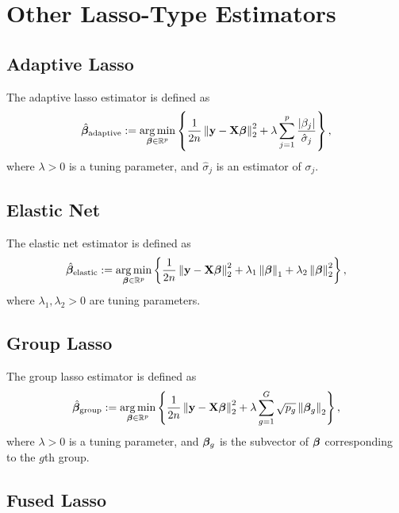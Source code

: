\section{Other Lasso-Type Estimators}

\subsection{Adaptive Lasso}

The adaptive lasso estimator is defined as
\begin{equation*}
	\hat{\boldsymbol{\beta}}_{\text{adaptive}}:=\underset{\boldsymbol{\beta}\in{\mathbb R}^{p}}{\arg\min}\left\{\frac{1}{2n}\left\|{\bf y}-{\bf X}\boldsymbol{\beta}\right\|_{2}^{2}+\lambda\sum_{j=1}^{p}\frac{\left|\beta_{j}\right|}{\hat{\sigma}_{j}}\right\},
\end{equation*}
where $\lambda>0$ is a tuning parameter, and $\hat{\sigma}_{j}$ is an estimator of $\sigma_{j}$.

\subsection{Elastic Net}

The elastic net estimator is defined as
\begin{equation*}
	\hat{\boldsymbol{\beta}}_{\text{elastic}}:=\underset{\boldsymbol{\beta}\in{\mathbb R}^{p}}{\arg\min}\left\{\frac{1}{2n}\left\|{\bf y}-{\bf X}\boldsymbol{\beta}\right\|_{2}^{2}+\lambda_{1}\left\|\boldsymbol{\beta}\right\|_{1}+\lambda_{2}\left\|\boldsymbol{\beta}\right\|_{2}^{2}\right\},
\end{equation*}
where $\lambda_{1},\lambda_{2}>0$ are tuning parameters.

\subsection{Group Lasso}

The group lasso estimator is defined as
\begin{equation*}
	\hat{\boldsymbol{\beta}}_{\text{group}}:=\underset{\boldsymbol{\beta}\in{\mathbb R}^{p}}{\arg\min}\left\{\frac{1}{2n}\left\|{\bf y}-{\bf X}\boldsymbol{\beta}\right\|_{2}^{2}+\lambda\sum_{g=1}^{G}\sqrt{p_{g}}\left\|\boldsymbol{\beta}_{g}\right\|_{2}\right\},
\end{equation*}
where $\lambda>0$ is a tuning parameter, and $\boldsymbol{\beta}_{g}$ is the subvector of $\boldsymbol{\beta}$ corresponding to the $g$th group.

\subsection{Fused Lasso}

